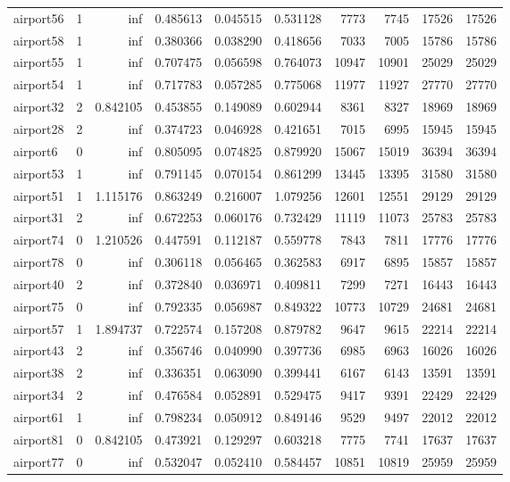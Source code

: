 \begin{longtable}{|l|r|r|r|r|r|r|r|r|r|}
airport56 & 1 & inf & 0.485613 & 0.045515 & 0.531128 & 7773 & 7745 & 17526 & 17526 \\
airport58 & 1 & inf & 0.380366 & 0.038290 & 0.418656 & 7033 & 7005 & 15786 & 15786 \\
airport55 & 1 & inf & 0.707475 & 0.056598 & 0.764073 & 10947 & 10901 & 25029 & 25029 \\
airport54 & 1 & inf & 0.717783 & 0.057285 & 0.775068 & 11977 & 11927 & 27770 & 27770 \\
airport32 & 2 & 0.842105 & 0.453855 & 0.149089 & 0.602944 & 8361 & 8327 & 18969 & 18969 \\
airport28 & 2 & inf & 0.374723 & 0.046928 & 0.421651 & 7015 & 6995 & 15945 & 15945 \\
airport6 & 0 & inf & 0.805095 & 0.074825 & 0.879920 & 15067 & 15019 & 36394 & 36394 \\
airport53 & 1 & inf & 0.791145 & 0.070154 & 0.861299 & 13445 & 13395 & 31580 & 31580 \\
airport51 & 1 & 1.115176 & 0.863249 & 0.216007 & 1.079256 & 12601 & 12551 & 29129 & 29129 \\
airport31 & 2 & inf & 0.672253 & 0.060176 & 0.732429 & 11119 & 11073 & 25783 & 25783 \\
airport74 & 0 & 1.210526 & 0.447591 & 0.112187 & 0.559778 & 7843 & 7811 & 17776 & 17776 \\
airport78 & 0 & inf & 0.306118 & 0.056465 & 0.362583 & 6917 & 6895 & 15857 & 15857 \\
airport40 & 2 & inf & 0.372840 & 0.036971 & 0.409811 & 7299 & 7271 & 16443 & 16443 \\
airport75 & 0 & inf & 0.792335 & 0.056987 & 0.849322 & 10773 & 10729 & 24681 & 24681 \\
airport57 & 1 & 1.894737 & 0.722574 & 0.157208 & 0.879782 & 9647 & 9615 & 22214 & 22214 \\
airport43 & 2 & inf & 0.356746 & 0.040990 & 0.397736 & 6985 & 6963 & 16026 & 16026 \\
airport38 & 2 & inf & 0.336351 & 0.063090 & 0.399441 & 6167 & 6143 & 13591 & 13591 \\
airport34 & 2 & inf & 0.476584 & 0.052891 & 0.529475 & 9417 & 9391 & 22429 & 22429 \\
airport61 & 1 & inf & 0.798234 & 0.050912 & 0.849146 & 9529 & 9497 & 22012 & 22012 \\
airport81 & 0 & 0.842105 & 0.473921 & 0.129297 & 0.603218 & 7775 & 7741 & 17637 & 17637 \\
airport77 & 0 & inf & 0.532047 & 0.052410 & 0.584457 & 10851 & 10819 & 25959 & 25959 \\

\end{longtable}
